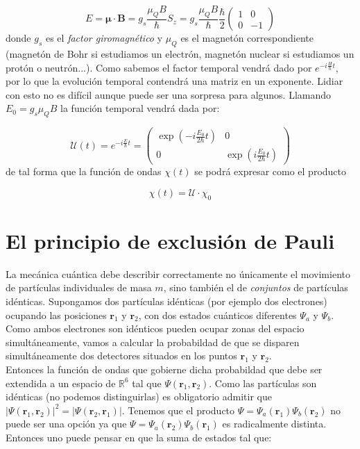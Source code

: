\documentclass[12pt]{article}
\newcommand{\rn}{\mathbf{r}}
\newcommand{\nmu}{\boldsymbol{\mu}}
\newcommand{\Bn}{\mathbf{B}}
\begin{document}
\begin{equation}
E = \nmu \cdot \Bn = g_s \dfrac{\mu_Q
 B}{\hbar} S_z = g_s \dfrac{\mu_Q B}{\hbar} \dfrac{\hbar}{2}  \begin{pmatrix}
 1 & 0 \\
 0 & -1 
 \end{pmatrix}
\end{equation}
donde $g_s$ es el \textit{factor giromagnético} y $\mu_Q$ es el magnetón correspondiente (magnetón de Bohr si estudiamos un electrón, magnetón nuclear si estudiamos un protón o neutrón...). Como sabemos el factor temporal vendrá dado por $e^{-i \frac{H}{\hbar} t}$, por lo que la evolución temporal contendrá una matriz en un exponente. Lidiar con esto no es difícil aunque puede ser una sorpresa para algunos. Llamando $E_0=g_s \mu_Q B$ la función temporal vendrá dada por:

\begin{equation} \mathcal{U} (t) = e^{- i \frac{E}{\hbar} t} = \begin{pmatrix}
\exp(- i \frac{E_0}{2\hbar} t ) & 0 \\
0 &  \exp (i \frac{E_0}{2\hbar} t)
\end{pmatrix} \end{equation}
de tal forma que la función de ondas $\chi (t)$ se podrá expresar como el producto 

\begin{equation}
\chi (t) = \mathcal{U} \cdot \chi_0
\end{equation}

\section{El principio de exclusión de Pauli}

La mecánica cuántica debe describir correctamente no únicamente el movimiento de partículas individuales de masa $m$, sino también el de \textit{conjuntos} de partículas idénticas. Supongamos dos partículas idénticas (por ejemplo dos electrones) ocupando las posiciones $\rn_1$ y $\rn_2$, con dos estados cuánticos diferentes $\Psi_a$ y $\Psi_b$. Como ambos electrones son idénticos pueden ocupar zonas del espacio simultáneamente, vamos a calcular la probabildad de que se disparen simultáneamente dos detectores situados en los puntos $\rn_1$ y $\rn_2$. \\
    
Entonces la función de ondas que gobierne dicha probabildad que debe ser extendida a un espacio de $\mathbb{R}^6$ tal que $\Psi (\rn_1, \rn_2)$. Como las partículas son idénticas (no podemos distinguirlas) es obligatorio admitir que $| \Psi (\rn_1,\rn_2) |^2 = | \Psi (\rn_2,\rn_1) |$. Tenemos que el producto $\Psi = \Psi_a (\rn_1) \Psi_b (\rn_2)$ no puede ser una opción ya que $\Psi = \Psi_a (\rn_2) \Psi_b (\rn_1)$ es radicalmente distinta. Entonces uno puede pensar en que la suma de estados tal que:
\end{document}
